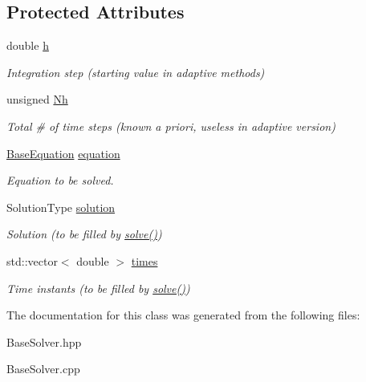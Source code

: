 \subsection*{Protected Attributes}
\begin{DoxyCompactItemize}
\item 
\mbox{\label{classBaseSolver_a6dbedd1610b0979379e6acbb0a4093cd}} 
double \hyperlink{classBaseSolver_a6dbedd1610b0979379e6acbb0a4093cd}{h}
\begin{DoxyCompactList}\small\item\em Integration step (starting value in adaptive methods) \end{DoxyCompactList}\item 
\mbox{\label{classBaseSolver_a645271429bc1e10e183a10c5b87dc1a1}} 
unsigned \hyperlink{classBaseSolver_a645271429bc1e10e183a10c5b87dc1a1}{Nh}
\begin{DoxyCompactList}\small\item\em Total \# of time steps (known a priori, useless in adaptive version) \end{DoxyCompactList}\item 
\mbox{\label{classBaseSolver_af6a2cea17c378f21a44293bda52ea07a}} 
\hyperlink{classBaseEquation}{Base\+Equation} \hyperlink{classBaseSolver_af6a2cea17c378f21a44293bda52ea07a}{equation}
\begin{DoxyCompactList}\small\item\em Equation to be solved. \end{DoxyCompactList}\item 
\mbox{\label{classBaseSolver_aa17362c89150f816e476d7e7616d23a4}} 
Solution\+Type \hyperlink{classBaseSolver_aa17362c89150f816e476d7e7616d23a4}{solution}
\begin{DoxyCompactList}\small\item\em Solution (to be filled by \hyperlink{classBaseSolver_a57f3b4ddec8693c61917aa37a2bac660}{solve()}) \end{DoxyCompactList}\item 
\mbox{\label{classBaseSolver_af772ecc8a738ec9b6f1b0fa470be2158}} 
std\+::vector$<$ double $>$ \hyperlink{classBaseSolver_af772ecc8a738ec9b6f1b0fa470be2158}{times}
\begin{DoxyCompactList}\small\item\em Time instants (to be filled by \hyperlink{classBaseSolver_a57f3b4ddec8693c61917aa37a2bac660}{solve()}) \end{DoxyCompactList}\end{DoxyCompactItemize}


The documentation for this class was generated from the following files\+:\begin{DoxyCompactItemize}
\item 
Base\+Solver.\+hpp\item 
Base\+Solver.\+cpp\end{DoxyCompactItemize}
